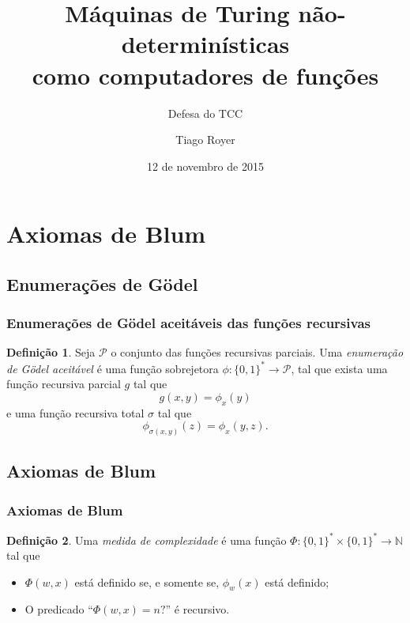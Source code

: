 \documentclass[utf8,notheorems]{beamer}
\theoremstyle{definition}
\newtheorem*{definition}{Definição}
\begin{document}
\author{Tiago Royer}
\title{
    Máquinas de Turing não-determinísticas \\
    como computadores de funções
}
\subtitle{Defesa do TCC}
\date{12 de novembro de 2015}
\begin{frame}
    \titlepage
\end{frame}

\section{Axiomas de Blum}

\subsection{Enumerações de Gödel}
\begin{frame}
    \frametitle{Enumerações de Gödel aceitáveis das funções recursivas}
    \begin{definition}
        Seja $\mathcal P$ o conjunto das funções recursivas parciais.
        Uma \emph{enumeração de Gödel aceitável}
        é uma função sobrejetora $\phi: \{0, 1\}^* \to \mathcal P$,
        tal que exista uma função recursiva parcial $g$ tal que
        \begin{equation*}
            g(x, y) = \phi_x(y)
        \end{equation*}
        e uma função recursiva total $\sigma$ tal que
        \begin{equation*}
            \phi_{\sigma(x, y)}(z) = \phi_x(y, z).
        \end{equation*}
    \end{definition}
\end{frame}

\subsection{Axiomas de Blum}
\begin{frame}
    \frametitle{Axiomas de Blum}
    \begin{definition}
        Uma \emph{medida de complexidade}
        é uma função $\Phi:\{0, 1\}^* \times \{0, 1\}^* \to \mathbb N$
        tal que
        \begin{itemize}
            \item $\Phi(w, x)$ está definido se, e somente se, $\phi_w(x)$ está definido;
            \item O predicado ``$\Phi(w, x) = n?$'' é recursivo.
        \end{itemize}
    \end{definition}
\end{frame}
\end{document}
